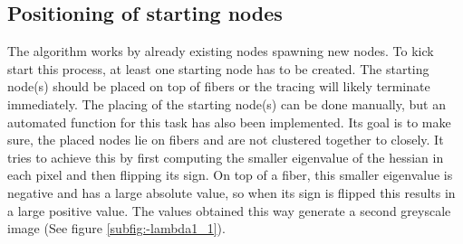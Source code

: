 \documentclass[12pt,english,twocolumn]{revtex4}
\begin{document}
\subsection{Positioning of starting nodes}
The algorithm works by already existing nodes spawning new nodes. To kick start this process, at least one starting node has to be created. The starting node(s) should be placed on top of fibers or the tracing will likely terminate immediately. The placing of the starting node(s) can be done manually, but an automated function for this task has also been implemented. Its goal is to make sure, the placed nodes lie on fibers and are not clustered together to closely. It tries to achieve this by first computing the smaller eigenvalue of the hessian in each pixel and then flipping its sign. On top of a fiber, this smaller eigenvalue is negative and has a large absolute value, so when its sign is flipped this results in a large positive value. The values obtained this way generate a second greyscale image (See figure \ref{subfig:-lambda1_1}).
\end{document}
